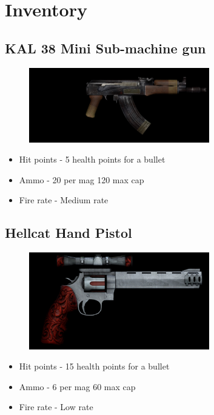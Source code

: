 \section{Inventory}
    \subsection{KAL 38 Mini Sub-machine gun}
        \begin{figure}[H]
            \centering
            \includegraphics[width=0.7\textwidth]{images/weapons/cutter}
        \end{figure}
        \begin{itemize}
            \item Hit points - 5 health points for a bullet
            \item Ammo - 20 per mag 120 max cap
            \item Fire rate - Medium rate
        \end{itemize}
    \subsection{Hellcat Hand Pistol}
        \begin{figure}[H]
            \centering
            \includegraphics[width=0.7\textwidth]{images/weapons/hellcat}
        \end{figure}
        \begin{itemize}
            \item Hit points - 15 health points for a bullet
            \item Ammo - 6 per mag 60 max cap
            \item Fire rate - Low rate
        \end{itemize}
